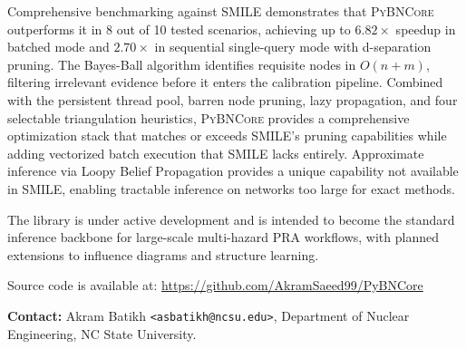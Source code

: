 \documentclass[11pt, letterpaper]{article}
\newcommand{\bncore}{\textsc{PyBNCore}}
\newcommand{\smiletool}{\textsc{SMILE}}
\theoremstyle{definitionstyle}
\begin{document}
Comprehensive benchmarking against \smiletool{} demonstrates that
\bncore{} outperforms it in 8 out of 10 tested scenarios, achieving up
to $6.82\times$ speedup in batched mode and $2.70\times$ in sequential
single-query mode with d-separation pruning. The Bayes-Ball algorithm
identifies requisite nodes in $O(n+m)$, filtering irrelevant evidence
before it enters the calibration pipeline. Combined with the persistent
thread pool, barren node pruning, lazy propagation, and four selectable
triangulation heuristics, \bncore{} provides a comprehensive optimization
stack that matches or exceeds \smiletool{}'s pruning capabilities while
adding vectorized batch execution that \smiletool{} lacks entirely.
Approximate inference via Loopy Belief Propagation provides a unique
capability not available in \smiletool{}, enabling tractable inference
on networks too large for exact methods.

The library is under active development and is intended to become the
standard inference backbone for large-scale multi-hazard PRA workflows,
with planned extensions to influence diagrams and structure learning.

Source code is available at:
\url{https://github.com/AkramSaeed99/PyBNCore}

\vspace{1em}
\noindent\textbf{Contact:} Akram Batikh \texttt{<asbatikh@ncsu.edu>},
Department of Nuclear Engineering, NC State University.

\end{document}
